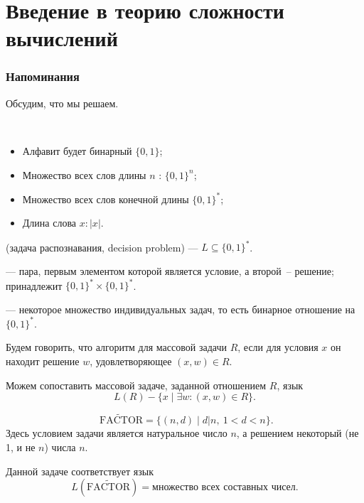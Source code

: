 \chapter{Введение в теорию сложности вычислений}
\subsection{Напоминания}
Обсудим, что мы решаем.
\begin{name}
	~\begin{itemize}
        \item Алфавит будет бинарный  $\{0, 1\}$;
		\item Множество всех слов длины $ n$ : $ \{0, 1\}^{n}$;
		\item  Множество всех слов конечной длины  $ \{0, 1\}^{*}$;
		\item Длина слова $ x\colon  \lvert x \rvert $.
	\end{itemize} 
\end{name}

\begin{defn}
	 (задача распознавания, decision problem) ---  $ L \subseteq \{0, 1\}^{*}$.

	\noindent
	 --- пара, первым элементом которой является условие, а второй~-- решение; принадлежит $ \{0, 1\}^{*} \times \{0, 1\}^{*}$.

	\noindent
	 --- некоторое множество индивидуальных задач, то есть бинарное отношение на $ \{0, 1\}^{*}$.
\end{defn}

\begin{defn}
	Будем говорить, что алгоритм  для массовой задачи $ R$, если для условия $ x$ он находит решение $ w$, удовлетворяющее $ (x, w) \in R$.

	\noindent
	Можем сопоставить массовой задаче, заданной отношением $ R$, язык
	\[
		L(R) - \{x \mid \exists w\colon (x, w) \in R\}
	.\] 
\end{defn}

\begin{ex}
	\[
		\widetilde{\text{ FACTOR}} = \{(n, d) \mid d | n, ~ 1<d<n\}
	.\]
	Здесь условием задачи является натуральное число  $ n$, а решением некоторый (не 1, и не $ n$) числа $ n$.

	Данной задаче соответствует язык 
	\[
		L(\widetilde{\text{FACTOR}}) = \text{множество всех составных чисел}
	.\] 
\end{ex}

